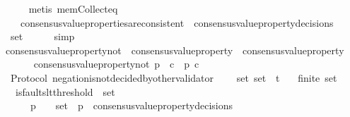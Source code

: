 \begin{isabellebody}
\ \ \ \ \isamarkupfalse%
\ {\isacharparenleft}metis\ mem{\isacharunderscore}Collect{\isacharunderscore}eq{\isacharparenright}\isanewline
\ \ \isamarkupfalse%
\isanewline
\ \ \ \ {\isachardoublequoteopen}consensus{\isacharunderscore}value{\isacharunderscore}properties{\isacharunderscore}are{\isacharunderscore}consistent\ {\isacharparenleft}{\isasymUnion}\ {\isacharbraceleft}consensus{\isacharunderscore}value{\isacharunderscore}property{\isacharunderscore}decisions\ {\isasymsigma}\ {\isacharbar}\ {\isasymsigma}{\isachardot}\ {\isasymsigma}\ {\isasymin}\ {\isasymsigma}{\isacharunderscore}set{\isacharbraceright}{\isacharparenright}{\isachardoublequoteclose}\isanewline
\ \ \ \ \isamarkupfalse%
\ simp\isanewline
{}\isamarkupfalse%
%
\endisatagproof
{\isafoldproof}%
%
\isadelimproof
\isanewline
%
\endisadelimproof
\isanewline
{}\isamarkupfalse%
\ consensus{\isacharunderscore}value{\isacharunderscore}property{\isacharunderscore}not\ {\isacharcolon}{\isacharcolon}\ {\isachardoublequoteopen}consensus{\isacharunderscore}value{\isacharunderscore}property\ {\isasymRightarrow}\ consensus{\isacharunderscore}value{\isacharunderscore}property{\isachardoublequoteclose}\isanewline
\ \ \isanewline
\ \ \ \ {\isachardoublequoteopen}consensus{\isacharunderscore}value{\isacharunderscore}property{\isacharunderscore}not\ p\ {\isacharequal}\ {\isacharparenleft}{\isasymlambda}c{\isachardot}\ {\isacharparenleft}{\isasymnot}\ p\ c{\isacharparenright}{\isacharparenright}{\isachardoublequoteclose}\isanewline
\isanewline
{}\isamarkupfalse%
\ {\isacharparenleft}\ Protocol{\isacharparenright}\ negation{\isacharunderscore}is{\isacharunderscore}not{\isacharunderscore}decided{\isacharunderscore}by{\isacharunderscore}other{\isacharunderscore}validator\ {\isacharcolon}\isanewline
\ \ {\isachardoublequoteopen}{\isasymforall}\ {\isasymsigma}{\isacharunderscore}set{\isachardot}\ {\isasymsigma}{\isacharunderscore}set\ {\isasymsubseteq}\ {\isasymSigma}t\isanewline
\ \ {\isasymlongrightarrow}\ finite\ {\isasymsigma}{\isacharunderscore}set\isanewline
\ \ {\isasymlongrightarrow}\ is{\isacharunderscore}faults{\isacharunderscore}lt{\isacharunderscore}threshold\ {\isacharparenleft}{\isasymUnion}\ {\isasymsigma}{\isacharunderscore}set{\isacharparenright}\isanewline
\ \ {\isasymlongrightarrow}\ {\isacharparenleft}{\isasymforall}\ {\isasymsigma}\ {\isasymsigma}{\isacharprime}\ p{\isachardot}\ {\isacharbraceleft}{\isasymsigma}{\isacharcomma}\ {\isasymsigma}{\isacharprime}{\isacharbraceright}\ {\isasymsubseteq}\ {\isasymsigma}{\isacharunderscore}set\ {\isasymand}\ p\ {\isasymin}\ consensus{\isacharunderscore}value{\isacharunderscore}property{\isacharunderscore}decisions\ {\isasymsigma}\ \isanewline

\end{isabellebody}
